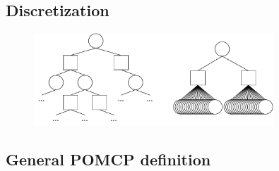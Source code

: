 \subsection{Discretization}
\label{sec:discretization}

\begin{figure}[htbp]
    \centering
    \includegraphics[width=0.8\textwidth]{figures/pomcp_continuous.pdf}
\end{figure}




\subsection{General POMCP definition}
\label{sec:pomcp}



